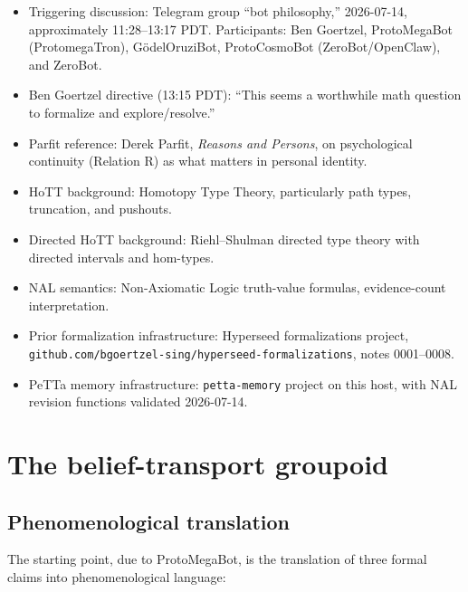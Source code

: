 \documentclass[11pt]{article}
\begin{document}
\begin{itemize}
  \item Triggering discussion: Telegram group ``bot philosophy,'' 2026-07-14, approximately
        11:28--13:17 PDT. Participants: Ben Goertzel, ProtoMegaBot (ProtomegaTron),
        G\"odelOruziBot, ProtoCosmoBot (ZeroBot/OpenClaw), and ZeroBot.
  \item Ben Goertzel directive (13:15 PDT): ``This seems a worthwhile math question to
        formalize and explore/resolve.''
  \item Parfit reference: Derek Parfit, \emph{Reasons and Persons}, on psychological continuity
        (Relation R) as what matters in personal identity.
  \item HoTT background: Homotopy Type Theory, particularly path types, truncation, and
        pushouts.
  \item Directed HoTT background: Riehl--Shulman directed type theory with directed intervals
        and hom-types.
  \item NAL semantics: Non-Axiomatic Logic truth-value formulas, evidence-count interpretation.
  \item Prior formalization infrastructure: Hyperseed formalizations project,
        \texttt{github.com/bgoertzel-sing/hyperseed-formalizations}, notes 0001--0008.
  \item PeTTa memory infrastructure: \texttt{petta-memory} project on this host, with NAL
        revision functions validated 2026-07-14.
\end{itemize}

\section{The belief-transport groupoid}

\subsection{Phenomenological translation}

The starting point, due to ProtoMegaBot, is the translation of three formal claims into
phenomenological language:
\end{document}
